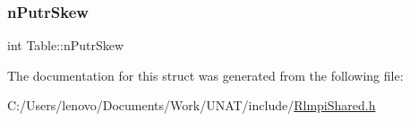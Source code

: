 \subsubsection{\texorpdfstring{nPutrSkew}{nPutrSkew}}
{\footnotesize\ttfamily int Table\+::n\+Putr\+Skew}



The documentation for this struct was generated from the following file\+:\begin{DoxyCompactItemize}
\item 
C\+:/\+Users/lenovo/\+Documents/\+Work/\+U\+N\+A\+T/include/\mbox{\hyperlink{include_2RlmpiShared_8h}{Rlmpi\+Shared.\+h}}\end{DoxyCompactItemize}
